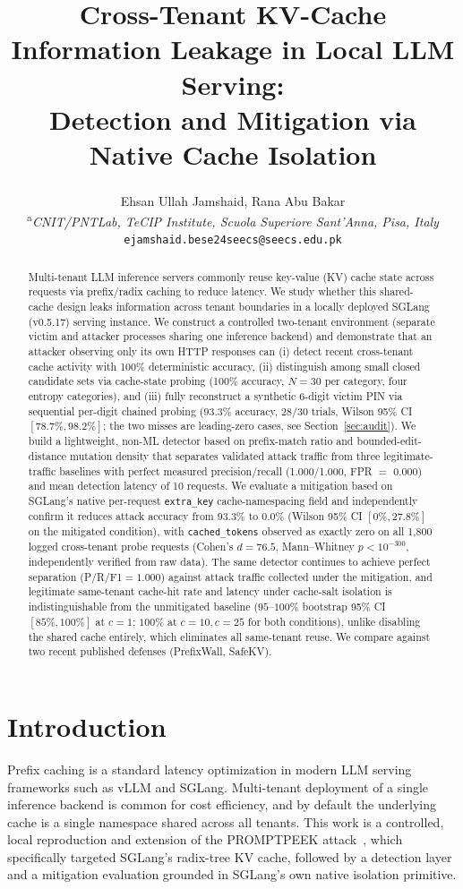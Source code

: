 \documentclass[11pt]{article}
\title{Cross-Tenant KV-Cache Information Leakage in Local LLM Serving:\\
Detection and Mitigation via Native Cache Isolation}
\author{
  Ehsan Ullah Jamshaid\textsuperscript{}, 
  Rana Abu Bakar\textsuperscript{} \\
  \textsuperscript{a}\textit{CNIT/PNTLab, TeCIP Institute, Scuola Superiore Sant'Anna, Pisa, Italy} \\
  \texttt{ejamshaid.bese24seecs@seecs.edu.pk}
}
\date{}
\begin{document}
\maketitle

\begin{abstract}
Multi-tenant LLM inference servers commonly reuse key-value (KV) cache
state across requests via prefix/radix caching to reduce latency. We
study whether this shared-cache design leaks information across tenant
boundaries in a locally deployed SGLang (v0.5.17) serving instance. We
construct a controlled two-tenant environment (separate victim and
attacker processes sharing one inference backend) and demonstrate that
an attacker observing only its own HTTP responses can (i) detect recent
cross-tenant cache activity with 100\% deterministic accuracy, (ii)
distinguish among small closed candidate sets via cache-state probing
(100\% accuracy, $N{=}30$ per category, four entropy categories), and
(iii) fully reconstruct a synthetic 6-digit victim PIN via sequential
per-digit chained probing ($93.3\%$ accuracy, $28/30$ trials,
Wilson 95\% CI $[78.7\%, 98.2\%]$; the two misses are
leading-zero cases, see Section~\ref{sec:audit}). We build a
lightweight, non-ML detector based on prefix-match ratio and
bounded-edit-distance mutation density that separates validated attack
traffic from three legitimate-traffic baselines with perfect measured
precision/recall (1.000/1.000, FPR $=$ 0.000) and mean detection latency
of 10 requests. We evaluate a mitigation based on SGLang's native
per-request \texttt{extra\_key} cache-namespacing field and
independently confirm it reduces attack accuracy from $93.3\%$ to
$0.0\%$ (Wilson 95\% CI $[0\%, 27.8\%]$ on the mitigated
condition), with \texttt{cached\_tokens} observed as exactly zero on all
1{,}800 logged cross-tenant probe requests (Cohen's $d=76.5$,
Mann--Whitney $p<10^{-300}$, independently verified from raw data). The
same detector continues to achieve perfect separation
(P/R/F1$=1.000$) against attack traffic collected under the mitigation,
and legitimate same-tenant cache-hit rate and latency under cache-salt
isolation is indistinguishable from the unmitigated baseline
($95$--$100\%$ bootstrap 95\% CI $[85\%, 100\%]$ at $c{=}1$;
$100\%$ at $c{=}10, c{=}25$ for both conditions), unlike disabling the shared cache
entirely, which eliminates all same-tenant reuse. We compare against
two recent published defenses (PrefixWall, SafeKV).
\end{abstract}

\section{Introduction}
Prefix caching is a standard latency optimization in modern LLM serving
frameworks such as vLLM and SGLang. Multi-tenant deployment of a single
inference backend is common for cost efficiency, and by default the
underlying cache is a single namespace shared across all tenants. This
work is a controlled, local reproduction and extension of the
PROMPTPEEK attack~\citep{wu2025promptpeek}, which specifically targeted
SGLang's radix-tree KV cache, followed by a detection layer and a
mitigation evaluation grounded in SGLang's own native isolation
primitive.
\end{document}
